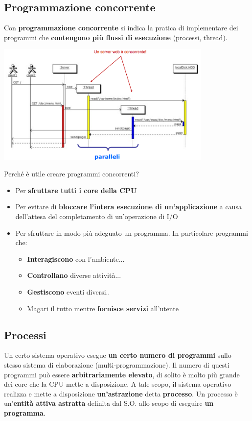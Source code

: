\documentclass[12pt]{article}
\begin{document}
\subsection{Programmazione concorrente}
Con \textbf{programmazione concorrente} si indica la pratica di implementare dei programmi che \textbf{contengono più flussi di esecuzione} (processi, thread).
\begin{center}
    \includegraphics[width = 0.80\textwidth]{Images/50.png}
\end{center}
Perché è utile creare programmi concorrenti?
\begin{itemize}
    \item Per \textbf{sfruttare tutti i core della CPU}
    \item Per evitare di \textbf{bloccare l'intera esecuzione di un'applicazione} a causa dell'attesa del completamento di un'operazione di I/O
    \item Per sfruttare in modo più adeguato un programma. In particolare programmi che:
          \begin{itemize}
              \item \textbf{Interagiscono} con l'ambiente...
              \item \textbf{Controllano} diverse attività...
              \item \textbf{Gestiscono} eventi diversi..
              \item Magari il tutto mentre \textbf{fornisce servizi} all'utente
          \end{itemize}
\end{itemize}
\subsection{Processi}
Un certo sistema operativo esegue \textbf{un certo numero di programmi} sullo stesso sistema di elaborazione (multi-programmazione). Il numero di questi programmi può essere \textbf{arbitrariamente elevato}, di solito è molto più grande dei core che la CPU mette a disposizione. A tale scopo, il sistema operativo realizza e mette a disposizione \textbf{un'astrazione} detta \textbf{processo}. Un processo è un'\textbf{entità attiva astratta} definita dal S.O. allo scopo di eseguire \textbf{un programma}.
\end{document}
